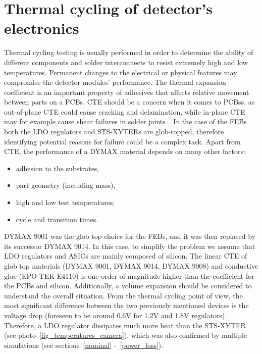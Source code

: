 \newpage
\section{Thermal cycling of detector's electronics}
\label{thermal_cycling}
Thermal cycling testing is usually performed in order to determine the ability of different components and solder interconnects to resist extremely high and low temperatures. Permanent changes to the electrical or physical features may compromise the detector modules' performance. The thermal expansion coefficient is an important property of adhesives that affects relative movement between parts on a \glspl{PCB}. \gls{CTE} should be a concern when it comes to \glspl{PCB}s, as out-of-plane \gls{CTE} could cause cracking and delamination, while in-plane \gls{CTE} may for example cause shear failures in solder joints~\cite{cte_report}. In the case of the \gls{FEB}s both the \gls{LDO} regulators and STS-XYTERs are glob-topped, therefore identifying potential reasons for failure could be a complex task. Apart from \gls{CTE}, the performance of a DYMAX material depends on many other factors:
\begin{itemize}
    \item adhesion to the substrates,
    \item part geometry (including mass),
    \item high and low test temperatures,
    \item cycle and transition times.
\end{itemize}
DYMAX 9001 was the glob top choice for the \glspl{FEB}, and it was then replaced by its successor DYMAX 9014. In this case, to simplify the problem we assume that \gls{LDO} regulators and \glspl{ASIC} are mainly composed of silicon. The linear CTE of glob top materials (DYMAX 9001, DYMAX 9014, DYMAX 9008) and conductive glue (EPO-TEK E4110) is one order of magnitude higher than the coefficient for the \glspl{PCB} and silicon. Additionally, a volume expansion should be considered to understand the overall situation. From the thermal cycling point of view, the most significant difference between the two previously mentioned devices is the voltage drop (foreseen to be around 0.6V for 1.2V and 1.8V regulators). Therefore, a \gls{LDO} regulator dissipates much more heat than the STS-XYTER (see photo~\ref{fig_temperatures_camera}), which was also confirmed by multiple simulations (see sections~\ref{nominal} -~\ref{power_loss}).

